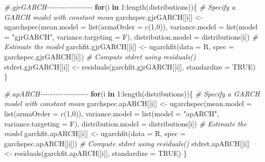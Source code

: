 \documentclass[a4paper, twoside]{templates/ociamthesis}
\newenvironment{Shaded}{\begin{snugshade}}{\end{snugshade}}
\newcommand{\AttributeTok}[1]{\textcolor[rgb]{0.77,0.63,0.00}{#1}}
\newcommand{\CommentTok}[1]{\textcolor[rgb]{0.56,0.35,0.01}{\textit{#1}}}
\newcommand{\ConstantTok}[1]{\textcolor[rgb]{0.00,0.00,0.00}{#1}}
\newcommand{\ControlFlowTok}[1]{\textcolor[rgb]{0.13,0.29,0.53}{\textbf{#1}}}
\newcommand{\DecValTok}[1]{\textcolor[rgb]{0.00,0.00,0.81}{#1}}
\newcommand{\FunctionTok}[1]{\textcolor[rgb]{0.00,0.00,0.00}{#1}}
\newcommand{\NormalTok}[1]{#1}
\newcommand{\OtherTok}[1]{\textcolor[rgb]{0.56,0.35,0.01}{#1}}
\newcommand{\SpecialCharTok}[1]{\textcolor[rgb]{0.00,0.00,0.00}{#1}}
\newcommand{\StringTok}[1]{\textcolor[rgb]{0.31,0.60,0.02}{#1}}
\renewenvironment{Shaded}
{
  \vspace{10pt}%
  \begin{snugshade}%
}{%
  \end{snugshade}%
  \vspace{8pt}%
}
\begin{document}
\begin{Shaded}
\begin{Highlighting}[]
\CommentTok{\#.gjrGARCH{-}{-}{-}{-}{-}{-}{-}{-}{-}{-}{-}{-}{-}{-}{-}{-}{-}{-}}
\ControlFlowTok{for}\NormalTok{(i }\ControlFlowTok{in} \DecValTok{1}\SpecialCharTok{:}\FunctionTok{length}\NormalTok{(distributions))\{}
\CommentTok{\# Specify a GARCH model with constant mean}
\NormalTok{garchspec.gjrGARCH[[i]] }\OtherTok{\textless{}{-}} \FunctionTok{ugarchspec}\NormalTok{(}\AttributeTok{mean.model =} \FunctionTok{list}\NormalTok{(}\AttributeTok{armaOrder =} \FunctionTok{c}\NormalTok{(}\DecValTok{1}\NormalTok{,}\DecValTok{0}\NormalTok{)),}
                     \AttributeTok{variance.model =} \FunctionTok{list}\NormalTok{(}\AttributeTok{model =} \StringTok{"gjrGARCH"}\NormalTok{, }\AttributeTok{variance.targeting =}\NormalTok{ F), }
                     \AttributeTok{distribution.model =}\NormalTok{ distributions[i])}
\CommentTok{\# Estimate the model}
\NormalTok{garchfit.gjrGARCH[[i]] }\OtherTok{\textless{}{-}} \FunctionTok{ugarchfit}\NormalTok{(}\AttributeTok{data =}\NormalTok{ R, }\AttributeTok{spec =}\NormalTok{ garchspec.gjrGARCH[[i]])}
\CommentTok{\# Compute stdret using residuals()}
\NormalTok{stdret.gjrGARCH[[i]] }\OtherTok{\textless{}{-}} \FunctionTok{residuals}\NormalTok{(garchfit.gjrGARCH[[i]], }\AttributeTok{standardize =} \ConstantTok{TRUE}\NormalTok{)}
\NormalTok{\}}

\CommentTok{\#.apARCH{-}{-}{-}{-}{-}{-}{-}{-}{-}{-}{-}{-}{-}{-}{-}{-}{-}{-}{-}}
\ControlFlowTok{for}\NormalTok{(i }\ControlFlowTok{in} \DecValTok{1}\SpecialCharTok{:}\FunctionTok{length}\NormalTok{(distributions))\{}
\CommentTok{\# Specify a GARCH model with constant mean}
\NormalTok{garchspec.apARCH[[i]] }\OtherTok{\textless{}{-}} \FunctionTok{ugarchspec}\NormalTok{(}\AttributeTok{mean.model =} \FunctionTok{list}\NormalTok{(}\AttributeTok{armaOrder =} \FunctionTok{c}\NormalTok{(}\DecValTok{1}\NormalTok{,}\DecValTok{0}\NormalTok{)),}
                     \AttributeTok{variance.model =} \FunctionTok{list}\NormalTok{(}\AttributeTok{model =} \StringTok{"apARCH"}\NormalTok{, }\AttributeTok{variance.targeting =}\NormalTok{ F), }
                     \AttributeTok{distribution.model =}\NormalTok{ distributions[i])}
\CommentTok{\# Estimate the model}
\NormalTok{garchfit.apARCH[[i]] }\OtherTok{\textless{}{-}} \FunctionTok{ugarchfit}\NormalTok{(}\AttributeTok{data =}\NormalTok{ R, }\AttributeTok{spec =}\NormalTok{ garchspec.apARCH[[i]])}
\CommentTok{\# Compute stdret using residuals()}
\NormalTok{stdret.apARCH[[i]] }\OtherTok{\textless{}{-}} \FunctionTok{residuals}\NormalTok{(garchfit.apARCH[[i]], }\AttributeTok{standardize =} \ConstantTok{TRUE}\NormalTok{)}
\NormalTok{\}}


\end{Highlighting}
\end{Shaded}
\end{document}
